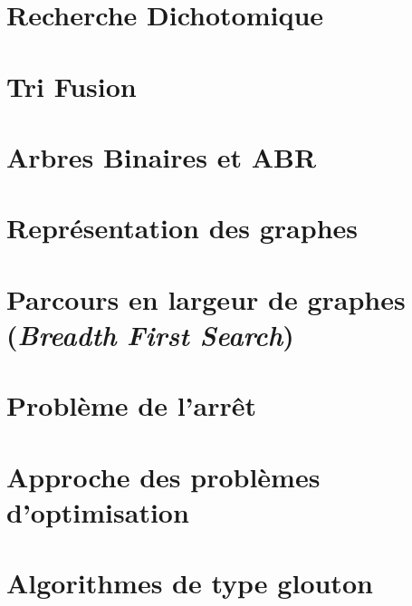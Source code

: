 \documentclass[11pt]{article} %
\begin{document}
\newpage
\section{Recherche Dichotomique }


\newpage
\section{Tri Fusion }


\newpage
\section{Arbres Binaires et ABR}


\newpage
\section{Représentation des graphes}


\newpage
\section{Parcours en largeur de graphes
\\ (\textit{Breadth First Search}) }


\newpage
\section{Problème de l'arrêt}


\newpage
\section{Approche des problèmes d’optimisation}


%

\newpage
\section{Algorithmes de type glouton}

\end{document}
